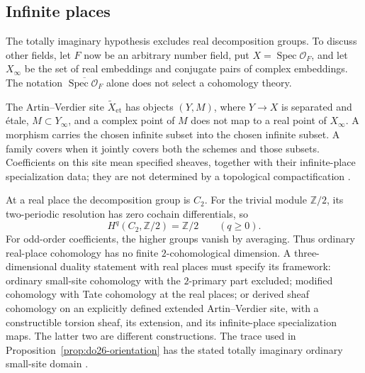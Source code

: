 \subsection{Infinite places}

The totally imaginary hypothesis excludes real decomposition groups.
To discuss other fields, let \(F\) now be an arbitrary number field,
put \(X=\operatorname{Spec}\mathcal O_F\), and let \(X_\infty\)
be the set of real embeddings and conjugate pairs of complex embeddings.
The notation \(\overline{\operatorname{Spec}\mathcal O_F}\) alone
does not select a cohomology theory.

The Artin--Verdier site \(\widetilde X_{\mathrm{et}}\) has objects
\((Y,M)\), where \(Y\to X\) is separated and \'etale,
\(M\subset Y_\infty\), and a complex point of \(M\) does not map
to a real point of \(X_\infty\). A morphism carries the chosen
infinite subset into the chosen infinite subset. A family covers when
it jointly covers both the schemes and those subsets. Coefficients on
this site mean specified sheaves, together with their infinite-place
specialization data; they are not determined by a topological
compactification \cite[\S1]{Bienenfeld1987}.

At a real place the decomposition group is \(C_2\). For the trivial
module \(\mathbb Z/2\), its two-periodic resolution has zero
cochain differentials, so
\[
 H^q(C_2,\mathbb Z/2)=\mathbb Z/2\qquad(q\geq0).
\]
For odd-order coefficients, the higher groups vanish by averaging.
Thus ordinary real-place cohomology has no finite
\(2\)-cohomological dimension. A three-dimensional duality statement
with real places must specify its framework: ordinary small-site
cohomology with the \(2\)-primary part excluded; modified cohomology
with Tate cohomology at the real places; or derived sheaf cohomology on
an explicitly defined extended Artin--Verdier site, with a constructible
torsion sheaf, its extension, and its infinite-place specialization
maps. The latter two are different constructions. The trace used in
Proposition~\ref{prop:do26-orientation} has the stated totally imaginary
ordinary small-site domain \cite[\S2]{Mazur1973}.

